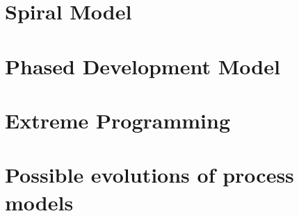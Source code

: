 \documentclass{style/CRPITStyle}
\begin{document}
\section{Spiral Model} %

\section{Phased Development Model} %

\section{Extreme Programming} %

\section{Possible evolutions of process models}




\end{document}
